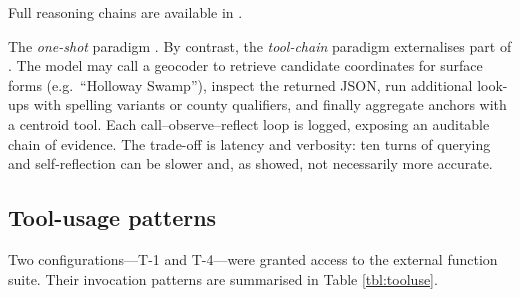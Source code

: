 Full reasoning chains are available in \DIFdelbegin {}\DIFdelend \DIFaddbegin {}\DIFaddend .

The \emph{one-shot} paradigm \DIFdelbegin {}\DIFdelend \DIFaddbegin {}\DIFaddend . By contrast, the
\emph{tool-chain} paradigm externalises part of \DIFdelbegin {}\DIFdelend \DIFaddbegin {}\DIFaddend . The
model may call a geocoder to retrieve candidate coordinates for surface
forms (e.g.~``Holloway Swamp''), inspect the returned JSON, run
additional look-ups with spelling variants or county qualifiers, and
finally aggregate anchors with a centroid tool. Each
call--observe--reflect loop is logged, exposing an auditable chain of
evidence. The trade-off is latency and verbosity: ten turns of querying
and self-reflection can be slower and, as \DIFdelbegin {}\DIFdelend \DIFaddbegin {} showed, not
necessarily more accurate.
\DIFdelbegin {}\emph{} %
\DIFdelend 

\subsection{Tool-usage patterns}\label{tool-usage-patterns}

Two configurations---T-1 and T-4---were granted access to the external
function suite. Their invocation patterns are summarised in Table
\ref{tbl:tooluse}.

